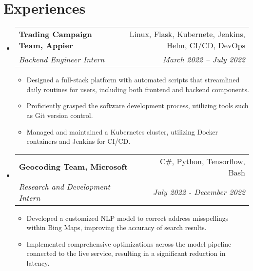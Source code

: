 \documentclass[letterpaper, 11pt]{extarticle}
\makeatletter
\newcommand{\resumeSubheading}[4]{
  \vspace{-1pt}\item
    \begin{tabular*}{0.97\textwidth}{l@{\extracolsep{\fill}}r}
      \textbf{#1} & #2 \\
      \textit{#3} & \textit{#4} \\
    \end{tabular*}\vspace{-5pt}
}
\newcommand{\resumeSubHeadingListStart}{\begin{itemize}[leftmargin=*]}
\newcommand{\resumeSubHeadingListEnd}{\end{itemize}}
\makeatother
\begin{document}
\section{Experiences}
  \resumeSubHeadingListStart
    \resumeSubheading{Trading Campaign Team, Appier}{\small Linux, Flask, Kubernete, Jenkins, Helm, CI/CD, DevOps}
    {Backend Engineer Intern}{March 2022 – July 2022}
    \begin{itemize}
    	\setlength\itemsep{0.001em}
        \item Designed a full-stack platform with automated scripts that streamlined daily routines for users, including both frontend and backend components.
        \item Proficiently grasped the software development process, utilizing tools such as Git version control.
    	\item Managed and maintained a Kubernetes cluster, utilizing Docker containers and Jenkins for CI/CD.
    \end{itemize}    
    \resumeSubheading{Geocoding Team, Microsoft}{\small C\#, Python, Tensorflow, Bash}
    {Research and Development Intern}{July 2022 -  December 2022}
		\begin{itemize}
            \setlength\itemsep{0.001em}
            \item Developed a customized NLP model to correct address misspellings within Bing Maps, improving the accuracy of search results.
            \item Implemented comprehensive optimizations across the model pipeline connected to the live service, resulting in a significant reduction in latency.
		\end{itemize}
\resumeSubHeadingListEnd
\vspace{-5pt}

\end{document}
